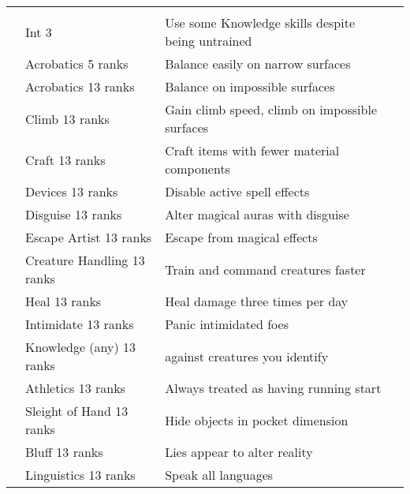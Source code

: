 {\begin{longtabu}{>{\lcol}p{10em} >{\lcol}p{15em} >{\lcol}X >{\lcol}p{3em}}
    \midrule
     &  &  &  \\
     & Int 3 & Use some Knowledge skills despite being untrained &  \\
     & Acrobatics 5 ranks & Balance easily on narrow surfaces &  \\
     & Acrobatics 13 ranks & Balance on impossible surfaces &  \\
     & Climb 13 ranks & Gain climb speed, climb on impossible surfaces &  \\
     & Craft 13 ranks & Craft items with fewer material components &  \\
     & Devices 13 ranks & Disable active spell effects &  \\
     & Disguise 13 ranks & Alter magical auras with disguise &  \\
     & Escape Artist 13 ranks & Escape from magical effects &  \\
     & Creature Handling 13 ranks & Train and command creatures faster &  \\
     & Heal 13 ranks & Heal damage three times per day &  \\
     & Intimidate 13 ranks & Panic intimidated foes &  \\
     & Knowledge (any) 13 ranks &  against creatures you identify &  \\
     & Athletics 13 ranks & Always treated as having running start &  \\
     & Sleight of Hand 13 ranks & Hide objects in pocket dimension &  \\
     & Bluff 13 ranks & Lies appear to alter reality &  \\
     & Linguistics 13 ranks & Speak all languages &  \\

\end{longtabu}}
